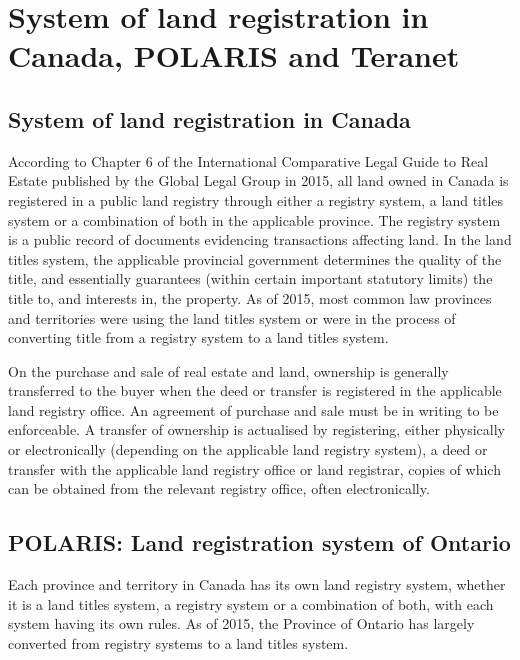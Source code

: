 \section{System of land registration in Canada, POLARIS and Teranet} \label{sec:system_of_land_registration_polaris_teranet}

\subsection{System of land registration in Canada} \label{subsec:land_reg_system_canada}

According to Chapter 6 of the International Comparative Legal Guide to Real Estate published by the Global Legal Group in 2015\cite{McKean2015}, all land owned in Canada is registered in a public land registry through either a registry system, a land titles system or a combination of both in the applicable province.
The registry system is a public record of documents evidencing transactions affecting land.
In the land titles system, the applicable provincial government determines the quality of the title, and essentially guarantees (within certain important statutory limits) the title to, and interests in, the property.
As of 2015, most common law provinces and territories were using the land titles system or were in the process of converting title from a registry system to a land titles system.

On the purchase and sale of real estate and land, ownership is generally transferred to the buyer when the deed or transfer is registered in the applicable land registry office.
An agreement of purchase and sale must be in writing to be enforceable.
A transfer of ownership is actualised by registering, either physically or electronically (depending on the applicable land registry system), a deed or transfer with the applicable land registry office or land registrar, copies of which can be obtained from the relevant registry office, often electronically.

\subsection{POLARIS: Land registration system of Ontario} \label{subsec:polaris}

Each province and territory in Canada has its own land registry system, whether it is a land titles system, a registry system or a combination of both, with each system having its own rules.
As of 2015, the Province of Ontario has largely converted from registry systems to a land titles system.

